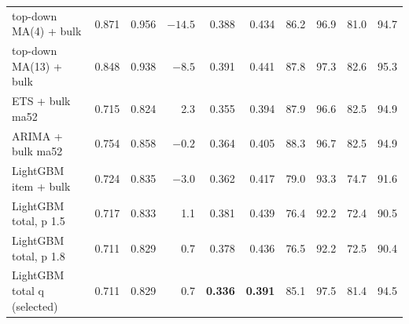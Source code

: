 \documentclass[11pt,a4paper]{article}
\begin{document}
\begin{table}[ht]
\begin{tabular}{l rrrrr rrrr}
    top-down MA(4) + bulk & 0.871 & 0.956 & $-14.5$ & 0.388 & 0.434 & 86.2 & 96.9 & 81.0 & 94.7 \\
    top-down MA(13) + bulk & 0.848 & 0.938 & $-8.5$ & 0.391 & 0.441 & 87.8 & 97.3 & 82.6 & 95.3 \\
    ETS + bulk ma52 & 0.715 & 0.824 & 2.3 & 0.355 & 0.394 & 87.9 & 96.6 & 82.5 & 94.9 \\
    ARIMA + bulk ma52 & 0.754 & 0.858 & $-0.2$ & 0.364 & 0.405 & 88.3 & 96.7 & 82.5 & 94.9 \\
    LightGBM item + bulk & 0.724 & 0.835 & $-3.0$ & 0.362 & 0.417 & 79.0 & 93.3 & 74.7 & 91.6 \\
    LightGBM total, p 1.5 & 0.717 & 0.833 & 1.1 & 0.381 & 0.439 & 76.4 & 92.2 & 72.4 & 90.5 \\
    LightGBM total, p 1.8 & 0.711 & 0.829 & 0.7 & 0.378 & 0.436 & 76.5 & 92.2 & 72.5 & 90.4 \\
    LightGBM total q (selected) & 0.711 & 0.829 & 0.7 & \textbf{0.336} & \textbf{0.391} & 85.1 &
      97.5 & 81.4 & 94.5 \\
    \bottomrule
  \end{tabular}
\end{table}
\end{document}
